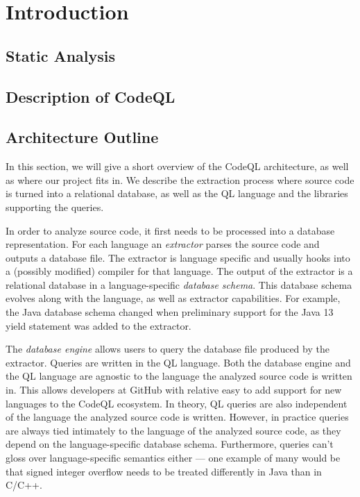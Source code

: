 \begin{abstract}
    \lipsum[1-2][1-20]
\end{abstract}
\tableofcontents

\newpage
\section{Introduction}
\subsection{Static Analysis}
\subsection{Description of CodeQL}

\subsection{Architecture Outline}
In this section, we will give a short overview of the CodeQL architecture, as well as where our
project fits in. We describe the extraction process where source code is turned into a relational database,
as well as the QL language and the libraries supporting the queries.

In order to analyze source code, it first needs to be processed into a database representation.
For each language an \emph{extractor} parses the source code and outputs a database file.
The extractor is language specific and usually hooks into a (possibly modified) compiler for that language.
The output of the extractor is a relational database in a language-specific \emph{database schema}.
This database schema evolves along with the language, as well as extractor capabilities.
For example, the Java database schema changed when preliminary support for the Java 13 yield statement was
added to the extractor.

The \emph{database engine} allows users to query the database file produced by the extractor.
Queries are written in the QL language.
Both the database engine and the QL language are agnostic to the language the analyzed source code 
is written in.
This allows developers at GitHub with relative easy to add support for new languages to the CodeQL ecosystem.
In theory, QL queries are also independent of the language the analyzed source code is written.
However, in practice queries are always tied intimately to the language of the analyzed source code,
as they depend on the language-specific database schema.
Furthermore, queries can't gloss over language-specific semantics either {---} one example of many would be
that signed integer overflow needs to be treated differently in Java than in C/C++.

